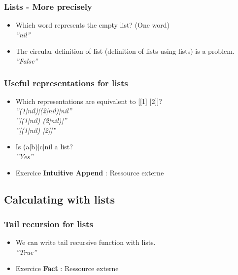\documentclass[fr,license=none]{../../../eplsummary}
\begin{document}
			\subsubsection*{Lists - More precisely}
				\begin{itemize}
					\item Which word represents the empty list? (One word)\\
						\textit{''nil''}
					\item The circular definition of list (definition of lists using lists) is a problem.\\
						\textit{''False''}
				\end{itemize}
			\subsubsection*{Useful representations for lists}
				\begin{itemize}
					\item Which representations are equivalent to [[1] [2]]?\\
						\textit{''(1|nil)|(2|nil)|nil''}\\
						\textit{''[(1|nil) (2|nil)]''}\\
						\textit{''[(1|nil) [2]]''}\\
					\item Is (a|b)|c|nil a list?\\
						\textit{''Yes''}
					\item Exercice \textbf{Intuitive Append} : Ressource externe\\
					
				\end{itemize}
		\subsection{Calculating with lists}
			\subsubsection*{Tail recursion for lists}
				\begin{itemize}
					\item We can write tail recursive function with lists.\\
						\textit{''True''}
					\item Exercice \textbf{Fact} : Ressource externe\\
					
				\end{itemize}
\end{document}

